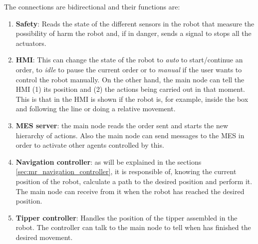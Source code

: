 The connections are bidirectional and their functions are:
\begin{enumerate}
	\item \textbf{Safety}: Reads the state of the different sensors in the robot that measure the possibility of harm the robot and, if in danger, sends a signal to stops all the actuators.  
	\item \textbf{HMI}: This can change the state of the robot to \emph{auto} to start/continue an order, to \emph{idle} to pause the current order or to \emph{manual} if the user wants to control the robot manually. On the other hand, the main node can tell the HMI (1) its position and (2) the actions being carried out in that moment. This is that in the HMI is shown if the robot is, for example, inside the box and following the line or doing a relative movement.
	\item \textbf{MES server}: the main node reads the order sent and starts the new hierarchy of actions. Also the main node can send messages to the MES in order to activate other agents controlled by this.
	\item \textbf{Navigation controller}: as will be explained in the sections \ref{sec:mr_navigation_controller}, it is responsible of, knowing the current position of the robot, calculate a path to the desired position and perform it. The main node can receive from it when the robot has reached the desired position.
	\item \textbf{Tipper controller}: Handles the position of the tipper assembled in the robot. The controller can talk to the main node to tell when has finished the desired movement.
\end{enumerate}


